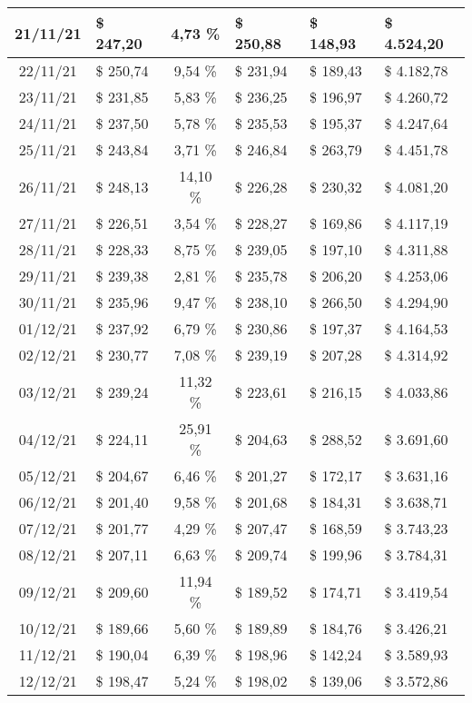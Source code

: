\begin{center}
\begin{small}
\begin{longtable}{|c|l|c|l|l|l|}
21/11/21 & \$ 247,20 & 4,73 \% & \$ 250,88 & \$ 148,93 & \$ 4.524,20 \\ \hline
22/11/21 & \$ 250,74 & 9,54 \% & \$ 231,94 & \$ 189,43 & \$ 4.182,78 \\ \hline
23/11/21 & \$ 231,85 & 5,83 \% & \$ 236,25 & \$ 196,97 & \$ 4.260,72 \\ \hline
24/11/21 & \$ 237,50 & 5,78 \% & \$ 235,53 & \$ 195,37 & \$ 4.247,64 \\ \hline
25/11/21 & \$ 243,84 & 3,71 \% & \$ 246,84 & \$ 263,79 & \$ 4.451,78 \\ \hline
26/11/21 & \$ 248,13 & 14,10 \% & \$ 226,28 & \$ 230,32 & \$ 4.081,20 \\ \hline
27/11/21 & \$ 226,51 & 3,54 \% & \$ 228,27 & \$ 169,86 & \$ 4.117,19 \\ \hline
28/11/21 & \$ 228,33 & 8,75 \% & \$ 239,05 & \$ 197,10 & \$ 4.311,88 \\ \hline
29/11/21 & \$ 239,38 & 2,81 \% & \$ 235,78 & \$ 206,20 & \$ 4.253,06 \\ \hline
30/11/21 & \$ 235,96 & 9,47 \% & \$ 238,10 & \$ 266,50 & \$ 4.294,90 \\ \hline
01/12/21 & \$ 237,92 & 6,79 \% & \$ 230,86 & \$ 197,37 & \$ 4.164,53 \\ \hline
02/12/21 & \$ 230,77 & 7,08 \% & \$ 239,19 & \$ 207,28 & \$ 4.314,92 \\ \hline
03/12/21 & \$ 239,24 & 11,32 \% & \$ 223,61 & \$ 216,15 & \$ 4.033,86 \\ \hline
04/12/21 & \$ 224,11 & 25,91 \% & \$ 204,63 & \$ 288,52 & \$ 3.691,60 \\ \hline
05/12/21 & \$ 204,67 & 6,46 \% & \$ 201,27 & \$ 172,17 & \$ 3.631,16 \\ \hline
06/12/21 & \$ 201,40 & 9,58 \% & \$ 201,68 & \$ 184,31 & \$ 3.638,71 \\ \hline
07/12/21 & \$ 201,77 & 4,29 \% & \$ 207,47 & \$ 168,59 & \$ 3.743,23 \\ \hline
08/12/21 & \$ 207,11 & 6,63 \% & \$ 209,74 & \$ 199,96 & \$ 3.784,31 \\ \hline
09/12/21 & \$ 209,60 & 11,94 \% & \$ 189,52 & \$ 174,71 & \$ 3.419,54 \\ \hline
10/12/21 & \$ 189,66 & 5,60 \% & \$ 189,89 & \$ 184,76 & \$ 3.426,21 \\ \hline
11/12/21 & \$ 190,04 & 6,39 \% & \$ 198,96 & \$ 142,24 & \$ 3.589,93 \\ \hline
12/12/21 & \$ 198,47 & 5,24 \% & \$ 198,02 & \$ 139,06 & \$ 3.572,86 \\ \hline

\end{longtable}
\end{small}
\end{center}
